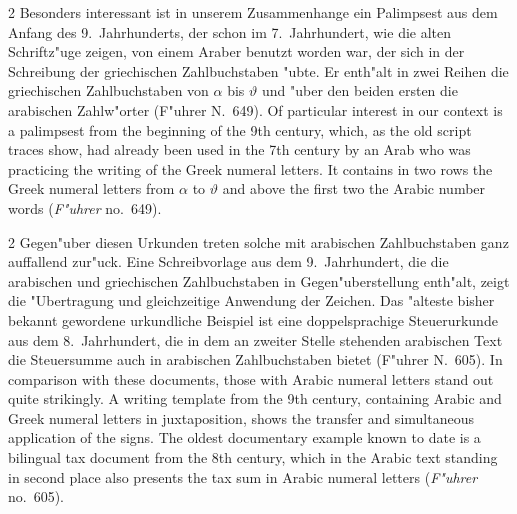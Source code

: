 \documentclass[10pt,a4paper]{article}
\renewcommand{\switchcolumn}{\syncronize\nointerlineskip\columnbreak}
\begin{document}
\begin{paracol}{2}
Besonders interessant ist in unserem Zusammenhange ein Palimpsest aus dem Anfang des 9.\ Jahrhunderts, der schon im 7.\ Jahrhundert, wie die alten Schriftz"uge zeigen, von einem Araber benutzt worden war, der sich in der Schreibung der griechischen Zahlbuchstaben "ubte. Er enth"alt in zwei Reihen die griechischen Zahlbuchstaben von $\alpha$ bis $\vartheta$ und "uber den beiden ersten die arabischen Zahlw"orter (F"uhrer N.\ 649).
\switchcolumn
Of particular interest in our context is a palimpsest from the beginning of the 9th century, which, as the old script traces show, had already been used in the 7th century by an Arab who was practicing the writing of the Greek numeral letters. It contains in two rows the Greek numeral letters from $\alpha$ to $\vartheta$ and above the first two the Arabic number words (\textit{F"uhrer} no.\ 649).
\end{paracol}

\begin{paracol}{2}
Gegen"uber diesen Urkunden treten solche mit arabischen Zahlbuchstaben ganz auffallend zur"uck. Eine Schreibvorlage aus dem 9.\ Jahrhundert, die die arabischen und griechischen Zahlbuchstaben in Gegen"uberstellung enth"alt, zeigt die "Ubertragung und gleichzeitige Anwendung der Zeichen. Das "alteste bisher bekannt gewordene urkundliche Beispiel ist eine doppelsprachige Steuerurkunde aus dem 8.\ Jahrhundert, die in dem an zweiter Stelle stehenden arabischen Text die Steuersumme auch in arabischen Zahlbuchstaben bietet (F"uhrer N.\ 605).
\switchcolumn
In comparison with these documents, those with Arabic numeral letters stand out quite strikingly. A writing template from the 9th century, containing Arabic and Greek numeral letters in juxtaposition, shows the transfer and simultaneous application of the signs. The oldest documentary example known to date is a bilingual tax document from the 8th century, which in the Arabic text standing in second place also presents the tax sum in Arabic numeral letters (\textit{F"uhrer} no.\ 605).
\end{paracol}
\end{document}
